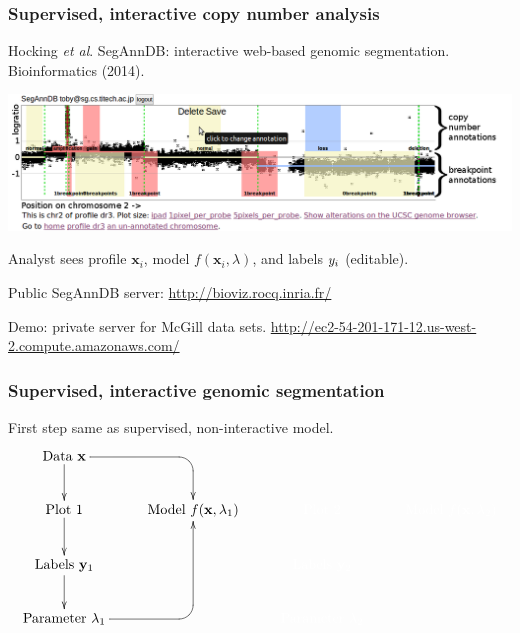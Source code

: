 \documentclass{beamer}
\begin{document}
\begin{frame}
  \frametitle{Supervised, interactive copy number analysis}

  Hocking \textit{et al}. SegAnnDB: interactive web-based genomic
  segmentation. Bioinformatics (2014).
  \begin{center}
\includegraphics[width=\textwidth]{new-new-annotations}
  \end{center}
  Analyst sees profile $\mathbf x_i$, model $f(\mathbf x_i, \lambda)$,
  and labels $\mathbf \mathbf y_i$ (editable).

  \vskip 0.1in Public SegAnnDB
  server: \url{http://bioviz.rocq.inria.fr/}

\vskip 0.1in
Demo: private server for McGill data sets.
\small
\url{http://ec2-54-201-171-12.us-west-2.compute.amazonaws.com/}

\end{frame}

\begin{frame}
  \frametitle{Supervised, interactive genomic segmentation}
  First step same as supervised, non-interactive model.
  \small
  \begin{displaymath}
  \xymatrix{
    \text{Data $\mathbf x$}
    \ar `[r] [dr] 
    \ar [d]
    & \text{ }
    & \text{ }
    & \text{ }
    \\
    \text{Plot 1} 
    \ar [d]
    & 
    \text{Model $f(\mathbf x, \lambda_1)$} 
    &
    \color{white}{\text{Plot 2} }
    & 
    \color{white}{\text{Model $f(\mathbf x, \lambda_2)$} }
    \\
    \text{Labels $\mathbf y_1$}       
    \ar [d]
    &
    &
    \color{white}{\text{Labels $\mathbf y_2$}}
    \\
    \text{Parameter $\lambda_1$} 
    \ar `r[ruu] [ruu]
    & \text{ }
    & 
    \color{white}{\text{Parameter $\lambda_2$}}
  }
  \end{displaymath}
\end{frame}
\end{document}
